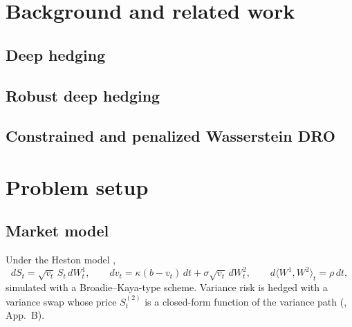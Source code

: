 \documentclass[11pt]{article}
\newif\ifshowguides
\newcommand{\guide}[1]{\ifshowguides
  \par\smallskip\noindent\fcolorbox{gray!50}{gray!6}{\parbox{\dimexpr\linewidth-2\fboxsep-2\fboxrule}{\small\itshape\color{gray!80!black}#1}}\par\smallskip\fi}
\begin{document}
\section{Background and related work}\label{sec:background}
\subsection{Deep hedging}
\guide{\cite{buehler2019}: network hedge positions, convex risk measure of terminal P\&L,
simulated paths; handles frictions and incomplete markets.}

\subsection{Robust deep hedging}
\guide{\cite{lss2022}: robustness through the training DATA (parameter intervals).
\cite{he2025}: robustness through the OBJECTIVE (worst case in a Wasserstein ball, solved by a
projected attack); its first-order structure comes from \cite{bartl2021,bai2023}. Your work
changes how that objective's ball is enforced.}

\subsection{Constrained and penalized Wasserstein DRO}
\guide{Define the Wasserstein ball and the worst-case expectation. State the Lagrangian dual
linking the constrained and penalized problems \cite{blanchet2019,gao2023} (\cref{eq:duality}).
Penalized adversarial training for neural networks: \cite{sinha2018}, with a convergence
guarantee when the loss is smooth in the input and $\lambda$ exceeds its curvature. Sensitivity
of the worst case in $\delta$: \cite{bartl2021}, used here for calibration.}

\section{Problem setup}\label{sec:setup}
\guide{Match the authors' code exactly. Notation: $h_t$ hedge positions, $\delta$ radius,
$\lambda$ penalty, $\alpha$ CVaR level, $\gamma$ clean-loss weight (code: \texttt{--alpha}).}

\subsection{Market model}
Under the Heston model \cite{heston1993},
\begin{equation}\label{eq:heston}
dS_t = \sqrt{v_t}\,S_t\,dW^1_t,\qquad
dv_t = \kappa(b - v_t)\,dt + \sigma\sqrt{v_t}\,dW^2_t,\qquad
d\langle W^1,W^2\rangle_t = \rho\,dt ,
\end{equation}
simulated with a Broadie--Kaya-type scheme. Variance risk is hedged with a variance swap whose
price $S^{(2)}_t$ is a closed-form function of the variance path (\cite{he2025}, App.~B).
\end{document}
